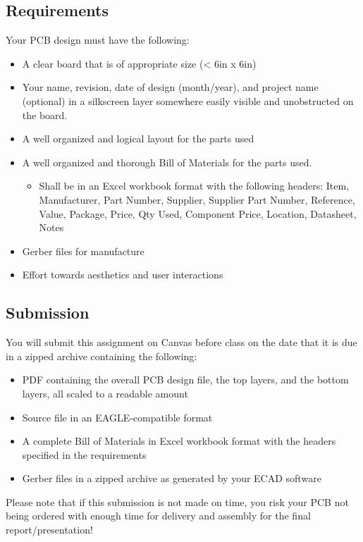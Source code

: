     \subsection*{Requirements}
    Your PCB design must have the following:
    \begin{itemize}
        \item A clear board that is of appropriate size (< 6in x 6in)
        \item Your name, revision, date of design (month/year), and project name (optional) in a silkscreen layer somewhere easily visible and unobstructed on the board.
        \item A well organized and logical layout for the parts used
        \item A well organized and thorough Bill of Materials for the parts used.
        \begin{itemize}
            \item Shall be in an Excel workbook format with the following headers: Item, Manufacturer, Part Number, Supplier, Supplier Part Number, Reference, Value, Package, Price, Qty Used, Component Price, Location, Datasheet, Notes
        \end{itemize}
        \item Gerber files for manufacture
        \item Effort towards aesthetics and user interactions
    \end{itemize}

    \subsection*{Submission}
    You will submit this assignment on Canvas before class on the date that it is due in a zipped archive containing the following:

    \begin{itemize}
        \item PDF containing the overall PCB design file, the top layers, and the bottom layers, all scaled to a readable amount
        \item Source file in an EAGLE-compatible format
        \item A complete Bill of Materials in Excel workbook format with the headers specified in the requirements
        \item Gerber files in a zipped archive as generated by your ECAD software
    \end{itemize}

    Please note that if this submission is not made on time, you risk your PCB not being ordered with enough time for delivery and assembly for the final report/presentation!

